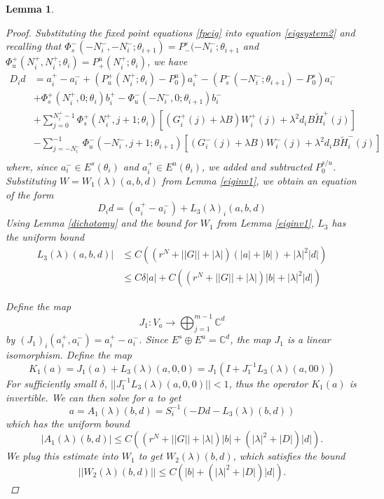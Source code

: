 \documentclass[12pt]{article}
\def\C{{\mathbb C}}
\newtheorem{lemma}{Lemma}
\begin{document}
\begin{lemma}
\begin{proof}
Substituting the fixed point equations \eqref{fpeig} into equation \eqref{eigsystem2} and recalling that $\Phi_s^-(-N_i^-, -N_i^-; \theta_{i+1}) = P_-^s(-N_i^-; \theta_{i+1}$ and $\Phi_u^+(N_i^+, N_i^+; \theta_i) = P_+^u(N_i^+; \theta_{i})$, we have
\begin{align}
D_i d &= a_i^+ - a_i^- + (P_u^+(N_i^+; \theta_i) - P_0^u) a_i^+ - (P_s^-(-N_i^-; \theta_{i+1}) - P_0^s) a_i^- \\
&+ \Phi_s^+(N_i^+, 0; \theta_i) b_i^+ - \Phi_u^-(-N_i^-, 0; \theta_{i+1}) b_i^- \nonumber \\
&+ \sum_{j = 0}^{N_i^+-1} \Phi_s^+(N_i^+, j+1; \theta_i) 
[(G_i^+(j) + \lambda B) W_i^+(j) + \lambda^2 d_i B \tilde{H}_i^+(j)] \nonumber \\
&- \sum_{j = -N_i^-}^{-1} \Phi_u^-(-N_i^-, j+1; \theta_{i+1}) 
[(G_i^-(j) + \lambda B) W_i^-(j) + \lambda^2 d_i B \tilde{H}_i^-(j)] \nonumber \\
\end{align}
where, since $a_i^- \in E^s(\theta_i)$ and $a_i^+ \in E^u(\theta_i)$, we added and subtracted $P_0^{s/u}$. Substituting $W = W_1(\lambda)(a, b, d)$ from Lemma \ref{eiginv1}, we obtain an equation of the form 
\begin{equation}\label{Dideq}
D_i d = (a_i^+ - a_i^-) + L_3(\lambda)_i(a,b,d)
\end{equation}
Using Lemma \ref{dichotomy} and the bound for $W_1$ from Lemma \ref{eiginv1}, $L_3$ has the uniform bound
\begin{align}\label{L3bound}
L_3(\lambda)(a,b,d)| &\leq C\left( (r^N + ||G|| + |\lambda| ) (|a| + |b|) + |\lambda|^2 |d|  \right) \\
&\leq C \delta |a| + C\left( (r^N + ||G|| + |\lambda| ) |b| + |\lambda|^2 |d|  \right) \nonumber
\end{align}

Define the map
\[
J_1: V_a \rightarrow \bigoplus_{j=1}^{m-1} \C^d
\]
by $(J_1)_i(a_i^+, a_i^-) = a_i^+ - a_i^-$. Since $E^s \oplus E^u = \C^d$, the map $J_1$ is a linear isomorphism. Define the map
\[
K_1(a) = J_1 (a) + L_3(\lambda)(a, 0, 0) = J_1( I + J_1^{-1} L_3(\lambda)(a, 0 0) )
\]
For sufficiently small $\delta$, $||J_1^{-1} L_3(\lambda)(a, 0, 0)|| < 1$, thus the operator $K_1(a)$ is invertible. We can then solve for $a$ to get
\[
a = A_1(\lambda)(b, d) = S_i^{-1}(-D d - L_3(\lambda)(b, d))
\]
which has the uniform bound
\begin{equation*}
|A_1(\lambda)(b, d)| \leq C \left( (r^N + ||G|| + |\lambda| ) |b| + (|\lambda|^2 + |D| ) |d|  \right).
\end{equation*}
We plug this estimate into $W_1$ to get $W_2(\lambda)(b,d)$, which satisfies the bound
\begin{equation*}
||W_2(\lambda)(b,d)|| \leq C \left( |b| + (|\lambda|^2 + |D|) |d| \right).
\end{equation*}


\end{proof}
\end{lemma}
\end{document}
